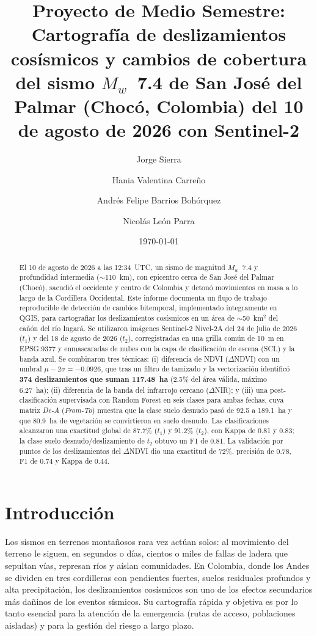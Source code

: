 \documentclass[12pt]{article}
\title{Proyecto de Medio Semestre: Cartografía de deslizamientos cosísmicos y cambios de cobertura del sismo $M_w$~7.4 de San José del Palmar (Chocó, Colombia) del 10 de agosto de 2026 con Sentinel-2}
\author{Jorge Sierra \and Hania Valentina Carreño \and Andrés Felipe Barrios Bohórquez \and Nicolás León Parra}
\date{\today}
\begin{document}
\maketitle

\begin{abstract}
El 10 de agosto de 2026 a las 12:34~UTC, un sismo de magnitud $M_w$~7.4 y profundidad intermedia ($\sim$110~km), con epicentro cerca de San José del Palmar (Chocó), sacudió el occidente y centro de Colombia y detonó movimientos en masa a lo largo de la Cordillera Occidental. Este informe documenta un flujo de trabajo reproducible de detección de cambios bitemporal, implementado íntegramente en QGIS, para cartografiar los deslizamientos cosísmicos en un área de $\sim$50~km$^2$ del cañón del río Ingará. Se utilizaron imágenes Sentinel-2 Nivel-2A del 24 de julio de 2026 ($t_1$) y del 18 de agosto de 2026 ($t_2$), corregistradas en una grilla común de 10~m en EPSG:9377 y enmascaradas de nubes con la capa de clasificación de escena (SCL) y la banda azul. Se combinaron tres técnicas: (i) diferencia de NDVI ($\Delta$NDVI) con un umbral $\mu - 2\sigma = -0.0926$, que tras un filtro de tamizado y la vectorización identificó \textbf{374 deslizamientos que suman 117.48~ha} (2.5\% del área válida, máximo 6.27~ha); (ii) diferencia de la banda del infrarrojo cercano ($\Delta$NIR); y (iii) una post-clasificación supervisada con Random Forest en seis clases para ambas fechas, cuya matriz \emph{De-A} (\emph{From-To}) muestra que la clase suelo desnudo pasó de 92.5 a 189.1~ha y que 80.9~ha de vegetación se convirtieron en suelo desnudo. Las clasificaciones alcanzaron una exactitud global de 87.7\% ($t_1$) y 91.2\% ($t_2$), con Kappa de 0.81 y 0.83; la clase suelo desnudo/deslizamiento de $t_2$ obtuvo un F1 de 0.81. La validación por puntos de los deslizamientos del $\Delta$NDVI dio una exactitud de 72\%, precisión de 0.78, F1 de 0.74 y Kappa de 0.44.
\end{abstract}

\section{Introducción}
Los sismos en terrenos montañosos rara vez actúan solos: al movimiento del terreno le siguen, en segundos o días, cientos o miles de fallas de ladera que sepultan vías, represan ríos y aíslan comunidades. En Colombia, donde los Andes se dividen en tres cordilleras con pendientes fuertes, suelos residuales profundos y alta precipitación, los deslizamientos cosísmicos son uno de los efectos secundarios más dañinos de los eventos sísmicos. Su cartografía rápida y objetiva es por lo tanto esencial para la atención de la emergencia (rutas de acceso, poblaciones aisladas) y para la gestión del riesgo a largo plazo.
\end{document}
